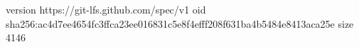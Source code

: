 version https://git-lfs.github.com/spec/v1
oid sha256:ac4d7ee4654fc3ffca23ee016831c5e8f4efff208f631ba4b5484e8413aca25e
size 4146
